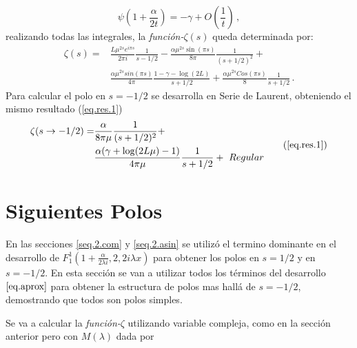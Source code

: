 \begin{equation}
    \psi(1 + \frac{\alpha}{2 t}) =
    - \gamma + O \left( \frac{1}{t} \right)
    \, ,
\end{equation}
realizando todas las integrales, la {\it función-$\zeta (s)$} queda determinada por:  
\begin{equation}
\begin{aligned}
    \zeta  (s)  = 
    & \frac{L \mu ^{2 s} e ^{i \pi s}}{2 \pi i} \frac{1}{s-1/2} 
    -\frac{\alpha \mu ^{2s} \sin(\pi s)}{8 \pi} \frac{1}{(s+1/2) ^2} + \\
    & \frac{\alpha \mu ^{2s} sin (\pi s) }{4 \pi } \frac{1 - \gamma -   \log (2 L)}{s+1/2}
    + \frac{\alpha \mu ^{2s} Cos(\pi s)}{8} \frac{1}{s+1/2}
    	\, .
\end{aligned}
\end{equation}
Para calcular el polo en $s=-1/2$ se desarrolla en Serie de Laurent, obteniendo el mismo resultado (\ref{eq.res.1})
\begin{equation}
\begin{aligned}
	\zeta (s \rightarrow -1/2) = 
    &\frac{\alpha}{8 \pi \mu } \frac{1}{(s+1/2)^2} + \\
	&\frac{\alpha ( \gamma  +  \log (2L \mu ) -1 )}{4 \pi \mu } \frac{1}{s+1/2} + \ Regular    
\end{aligned}
\tag{\ref{eq.res.1}}
\end{equation}



\section{Siguientes Polos}\label{sec.sig.polos}


En las secciones \ref{seq.2.com} y \ref{seq.2.asin} se utilizó el termino dominante en el desarrollo de $F _{1} ^{1} \left( 1+\frac{ \alpha}{2 \lambda i },2,2 i \lambda x \right)$ para obtener los polos en $s=1/2$ y en $s=-1/2$. En esta sección se van a utilizar todos los términos del desarrollo $\ref{eq.aprox}$ para obtener la estructura de polos mas hallá de $s=-1/2$, demostrando que todos son polos simples. 


Se va a calcular la {\it función-$\zeta$} utilizando variable compleja, como en la sección anterior pero con $M ( \lambda )$ dada por



